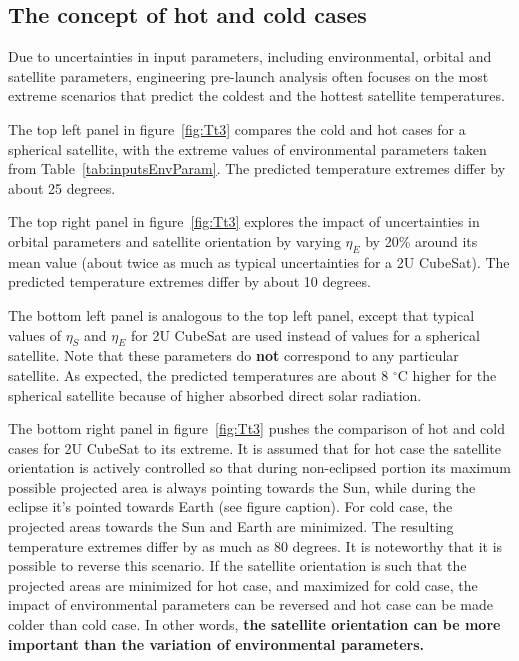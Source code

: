 \documentclass[]{aastex62}
\begin{document}
\subsection{The concept of hot and cold cases} 

Due to uncertainties in input parameters, including environmental, orbital and satellite parameters,
engineering pre-launch analysis often focuses on the most extreme scenarios that predict the coldest 
and the hottest satellite temperatures. 
 
The top left panel in figure~\ref{fig:Tt3} compares the cold and hot cases for a spherical satellite, 
with the extreme values of environmental parameters taken from Table~\ref{tab:inputsEnvParam}. 
The predicted temperature extremes differ by about 25 degrees.
 
The top right panel in figure~\ref{fig:Tt3} explores the impact of uncertainties in orbital parameters 
and satellite orientation by varying $\eta_E$ by 20\% around its mean value (about twice as much 
as typical uncertainties for a 2U CubeSat). The predicted temperature extremes differ by about 
10 degrees.

The bottom left panel is analogous to the top left panel, except that typical values of $\eta_S$
and $\eta_E$ for 2U CubeSat are used instead of values for a spherical satellite. 
Note that these parameters do {\bf not} correspond to any particular satellite.  
As expected, the predicted temperatures are about 8 $^\circ$C higher for the spherical satellite 
because of higher absorbed direct solar radiation. 

The bottom right panel in figure~\ref{fig:Tt3} pushes the comparison of hot and cold cases for 
2U CubeSat to its extreme. It is assumed that for hot case the satellite orientation is actively 
controlled so that during non-eclipsed portion its maximum possible projected area is always 
pointing towards the Sun, while during the eclipse it's pointed towards Earth (see figure caption). 
For cold case, the projected areas towards the Sun and Earth are minimized. The resulting
temperature extremes differ by as much as 80 degrees. It is noteworthy that it is possible
to reverse this scenario. If the satellite orientation is such that  the projected areas are
minimized for hot case, and maximized for cold case, the impact of environmental parameters 
can be reversed and hot case can be made colder than cold case. In other words, {\bf the satellite 
orientation can be more important than the variation of environmental parameters.} 
\end{document}
